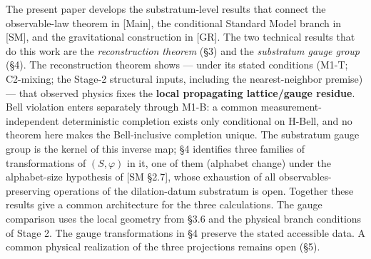 \documentclass[
]{article}
\begin{document}
The present paper develops the substratum-level results that connect the
observable-law theorem in {[}Main{]}, the conditional Standard Model
branch in {[}SM{]}, and the gravitational construction in {[}GR{]}. The
two technical results that do this work are the \emph{reconstruction
theorem} (§3) and the \emph{substratum gauge group} (§4). The
reconstruction theorem shows --- under its stated conditions (M1-T;
C2-mixing; the Stage-2 structural inputs, including the nearest-neighbor
premise) --- that observed physics fixes the \textbf{local propagating
lattice/gauge residue}. Bell violation enters separately through M1-B: a
common measurement-independent deterministic completion exists only
conditional on H-Bell, and no theorem here makes the Bell-inclusive
completion unique. The substratum gauge group is the kernel of this
inverse map; §4 identifies three families of transformations of
\((S, \varphi)\) in it, one of them (alphabet change) under the
alphabet-size hypothesis of {[}SM §2.7{]}, whose exhaustion of all
observables-preserving operations of the dilation-datum substratum is
open. Together these results give a common architecture for the three
calculations. The gauge comparison uses the local geometry from §3.6 and
the physical branch conditions of Stage 2. The gauge transformations in
§4 preserve the stated accessible data. A common physical realization of
the three projections remains open (§5).
\end{document}
